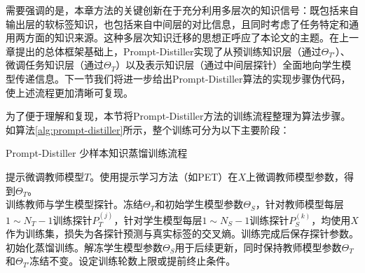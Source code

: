 \documentclass[../main.tex]{subfiles}
\begin{document}
需要强调的是，本章方法的关键创新在于充分利用多层次的知识信号：既包括来自输出层的软标签知识，也包括来自中间层的对比信息，且同时考虑了任务特定和通用两方面的知识来源。这种多层次知识迁移的思想正呼应了本论文的主题。在上一章提出的总体框架基础上，Prompt-Distiller实现了从预训练知识层（通过$\Theta_{T'}$）、微调任务知识层（通过$\Theta_T$）以及表示知识层（通过中间层探针）全面地向学生模型传递信息。下一节我们将进一步给出Prompt-Distiller算法的实现步骤伪代码，使上述流程更加清晰可复现。

\label{sec:3-4}
为了便于理解和复现，本节将Prompt-Distiller方法的训练流程整理为算法步骤。如算法\ref{alg:prompt-distiller}所示，整个训练可分为以下主要阶段：

\begin{algorithm}[t]
	\small
	\caption{Prompt-Distiller 少样本知识蒸馏训练流程}
	\label{alg:prompt-distiller}
	\BlankLine
	提示微调教师模型$T$。使用提示学习方法（如PET）在$X$上微调教师模型参数，得到$\Theta_T$。\\[0.5ex]
	训练教师与学生模型探针。冻结$\Theta_T$和初始学生模型参数$\Theta_S$，针对教师模型每层$1\sim N_T-1$训练探针$P_T^{(j)}$，针对学生模型每层$1\sim N_S-1$训练探针$P_S^{(k)}$，均使用$X$作为训练集，损失为各探针预测与真实标签的交叉熵。训练完成后保存探针参数。\\[0.5ex]
	初始化蒸馏训练。解冻学生模型参数$\Theta_S$用于后续更新，同时保持教师模型参数$\Theta_T$和$\Theta_{T'}$冻结不变。设定训练轮数上限或提前终止条件。\\[0.5ex]
\end{algorithm}
\end{document}
